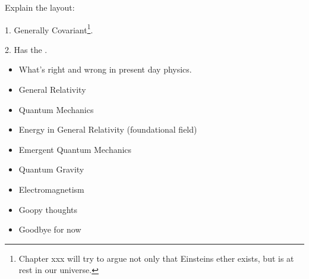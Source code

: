 \documentclass[../rzero]{subfiles}
\begin{document}
Explain the layout:



1. Generally Covariant\footnote{Chapter xxx will try to argue not only that Einsteins ether exists, but is at rest in our universe.}.

2. Has the .


\begin{itemize}
  \item What's right and wrong in present day physics.
  \item General Relativity
  \item Quantum Mechanics
  \item Energy in General Relativity (foundational field)
  \item Emergent Quantum Mechanics
  \item Quantum Gravity
  \item Electromagnetism
  \item Goopy thoughts 
  \item Goodbye for now
\end{itemize}
\end{document}
